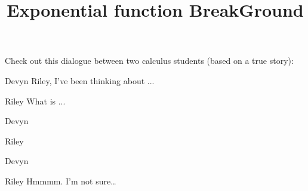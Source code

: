 \documentclass{ximera}
\title[Break-Ground:]{ Exponential function BreakGround}
\begin{document}
\begin{abstract}
\end{abstract}
\maketitle

Check out this dialogue between two calculus students (based on a true
story):

\begin{dialogue}
\item[Devyn] Riley, I've been thinking about ...
\item[Riley] What is ...
\item[Devyn] 
\item[Riley] 
\item[Devyn] 
\item[Riley] Hmmmm. I'm not sure\dots
\end{dialogue}





\end{document}
